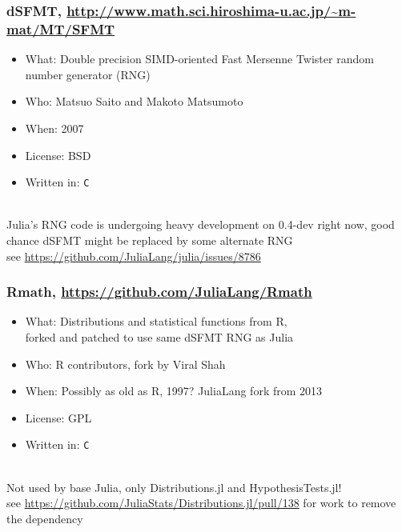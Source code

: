 \documentclass[compressed,dvips,letter]{beamer}
\begin{document}
\begin{frame}\frametitle{dSFMT, {\small \url{http://www.math.sci.hiroshima-u.ac.jp/~m-mat/MT/SFMT}}}

\begin{itemize}
\item What: Double precision SIMD-oriented Fast Mersenne Twister random number generator (RNG)
\item Who: Matsuo Saito and Makoto Matsumoto
\item When: 2007
\item License: BSD
\item Written in: \texttt{C}
\end{itemize}

~\\
Julia's RNG code is undergoing heavy development on 0.4-dev right now, good chance dSFMT might be replaced by some alternate RNG \\
see \url{https://github.com/JuliaLang/julia/issues/8786}

\end{frame}

%
%

\begin{frame}\frametitle{Rmath, \url{https://github.com/JuliaLang/Rmath}}

\begin{itemize}
\item What: Distributions and statistical functions from R, \\
forked and patched to use same dSFMT RNG as Julia
\item Who: R contributors, fork by Viral Shah
\item When: Possibly as old as R, 1997? JuliaLang fork from 2013
\item License: GPL
\item Written in: \texttt{C}
\end{itemize}

~\\
Not used by base Julia, only Distributions.jl and HypothesisTests.jl! \\
see \url{https://github.com/JuliaStats/Distributions.jl/pull/138} for work to remove the dependency

\end{frame}
\end{document}
